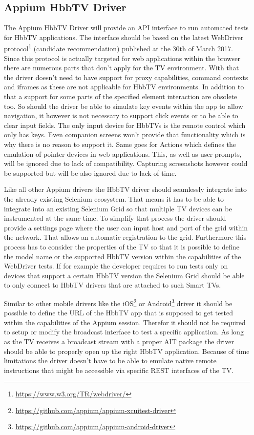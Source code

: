 \subsection{Appium HbbTV Driver}

The Appium HbbTV Driver will provide an API interface to run automated tests for HbbTV applications. The interface should be based on the latest WebDriver protocol\footnote{\url{https://www.w3.org/TR/webdriver/}} (candidate recommendation) published at the 30th of March 2017. Since this protocol is actually targeted for web applications within the browser there are numerous parts that don't apply for the TV environment. With that the driver doesn't need to have support for proxy capabilities, command contexts and iframes as these are not applicable for HbbTV environments. In addition to that a support for some parts of the specified element interaction are obsolete too. So should the driver be able to simulate key events within the app to allow navigation, it however is not necessary to support click events or to be able to clear input fields. The only input device for HbbTVs is the remote control which only has keys. Even companion screens won't provide that functionality which is why there is no reason to support it. Same goes for Actions which defines the emulation of pointer devices in web applications. This, as well as user prompts, will be ignored due to lack of compatibility. Capturing screenshots however could be supported but will be also ignored due to lack of time.

Like all other Appium drivers the HbbTV driver should seamlessly integrate into the already existing Selenium ecosystem. That means it has to be able to integrate into an existing Selenium Grid so that multiple TV devices can be instrumented at the same time. To simplify that process the driver should provide a settings page where the user can input host and port of the grid within the network. That allows an automatic registration to the grid. Furthermore this process has to consider the properties of the TV so that it is possible to define the model name or the supported HbbTV version within the capabilities of the WebDriver tests. If for example the developer requires to run tests only on devices that support a certain HbbTV version the Selenium Grid should be able to only connect to HbbTV drivers that are attached to such Smart TVs.

Similar to other mobile drivers like the iOS\footnote{\url{https://github.com/appium/appium-xcuitest-driver}} or Android\footnote{\url{https://github.com/appium/appium-android-driver}} driver it should be possible to define the URL of the HbbTV app that is supposed to get tested within the capabilities of the Appium session. Therefor it should not be required to setup or modify the broadcast interface to test a specific application. As long as the TV receives a broadcast stream with a proper AIT package the driver should be able to properly open up the right HbbTV application. Because of time limitations the driver doesn't have to be able to emulate native remote instructions that might be accessible via specific REST interfaces of the TV.

